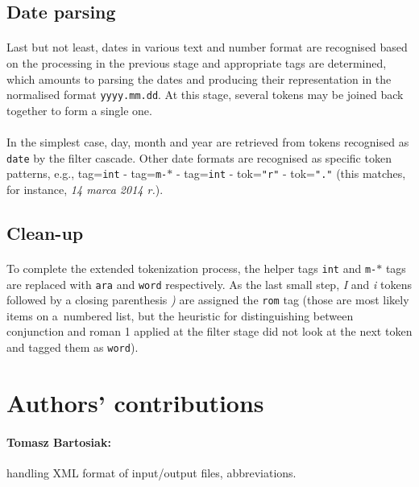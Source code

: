 \documentclass[oneside,12pt]{article}
\begin{document}
\subsection{Date parsing}

\paragraph{}
Last but not least, dates in various text and number format are recognised based on the processing in the previous stage and appropriate tags are determined, which amounts to parsing the dates and producing their representation in the normalised format \texttt{yyyy.mm.dd}. At this stage, several tokens may be joined back together to form a single one.

\paragraph{}
In the simplest case, day, month and year are retrieved from tokens recognised as \texttt{date} by the filter cascade. Other date formats are recognised as specific token patterns, e.g., tag=\texttt{int} - tag=\texttt{m-$\ast$} - tag=\texttt{int} - tok=\texttt{"r"} - tok=\texttt{"."} (this matches, for instance, \textit{14 marca 2014 r.}).

\subsection{Clean-up}

\paragraph{}
To complete the extended tokenization process, the helper tags \texttt{int} and \texttt{m-$\ast$} tags are replaced with \texttt{ara} and \texttt{word} respectively. As the last small step, \textit{I} and \textit{i} tokens followed by a closing parenthesis \textit{)} are assigned the \texttt{rom} tag (those are most likely items on a~numbered list, but the heuristic for distinguishing between conjunction and roman 1 applied at the filter stage did not look at the next token and tagged them as \texttt{word}).

\section{Authors' contributions}

\paragraph{Tomasz Bartosiak:} handling XML format of input/output files, abbreviations.
\end{document}
